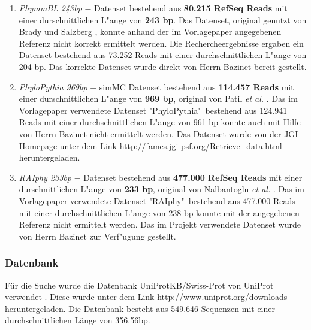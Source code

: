 \documentclass[10pt, a4paper]{article}[08.12.2015]
\begin{document}
\begin{enumerate}
          \item \textit{PhymmBL 243bp} $-$ Datenset bestehend aus 
          \textbf{80.215 RefSeq
          Reads} mit einer durschnittlichen L"ange von
          \textbf{243 bp}. Das Datenset, original genutzt von Brady und 
          Salzberg \cite{bradysalzberg2009},  
          konnte anhand der im Vorlagepaper angegebenen Referenz nicht 
          korrekt ermittelt werden. Die Rechercheergebnisse
          ergaben ein Datenset bestehend aus 73.252 Reads mit einer 
          durchschnittlichen L"ange von 204 bp. Das korrekte
          Datenset wurde direkt von Herrn
          Bazinet bereit gestellt.  
          
          \item \textit{PhyloPythia 969bp} $-$ simMC Datenset bestehend aus
          \textbf{114.457 Reads} mit einer durschnittlichen L"ange von
          \textbf{969 bp}, original von Patil \textit{et al.} \cite{patil2011}. 		  Das im Vorlagepaper verwendete Datenset 
          "PhyloPythia"\ bestehend aus 124.941 Reads mit einer 
          durchschnittlichen L"ange von 961 bp konnte
          auch mit Hilfe von Herrn Bazinet nicht ermittelt werden.
          Das Datenset wurde von der JGI Homepage unter dem Link
          \url{http://fames.jgi-psf.org/Retrieve_data.html} heruntergeladen.  
          
          \item \textit{RAIphy 233bp} $-$ Datenset bestehend aus
          \textbf{477.000 RefSeq Reads} mit einer durschnittlichen L"ange von
          \textbf{233 bp}, original von Nalbantoglu \textit{et al.} 					  \cite{nalbantoglu2011}. Das im Vorlagepaper verwendete Datenset 
          "RAIphy"\ bestehend aus 477.000 Reads mit einer 
          durchschnittlichen L"ange von 238 bp konnte
          mit der angegebenen Referenz nicht ermittelt werden.
          Das im Projekt verwendete Datenset wurde von Herrn Bazinet zur
          Verf"ugung gestellt.
          
        \end{enumerate}
        
      \subsubsection{Datenbank}
      F\"ur die Suche wurde die Datenbank UniProtKB/Swiss-Prot von UniProt 			  verwendet \cite{bairoch2004}.
      Diese wurde unter dem Link \url{http://www.uniprot.org/downloads}
      heruntergeladen.
      Die Datenbank besteht aus 549.646 Sequenzen mit einer durchschnittlichen 
      L\"ange von 356.56bp.
\end{document}
